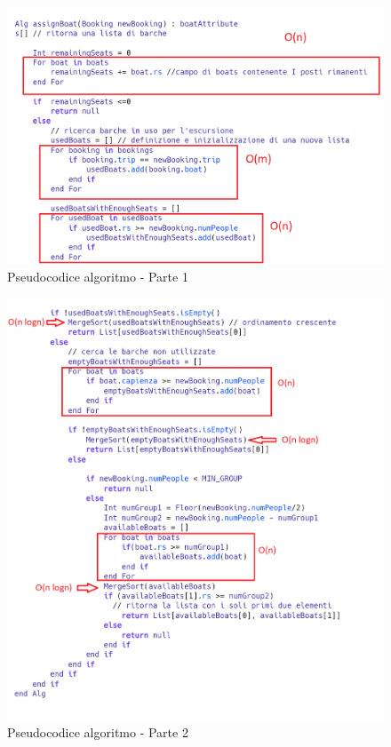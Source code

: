 \begin{figure}[htbp]
    \includegraphics[scale=0.5]{images/iterazione2/pseudocodice/1.png}
    \centering
    \caption{Pseudocodice algoritmo - Parte 1}
    \label{fig:pseudocodice1}
\end{figure}
\begin{figure}[htbp]
    \includegraphics[scale=0.5]{images/iterazione2/pseudocodice/2.png}
    \centering
    \caption{Pseudocodice algoritmo - Parte 2}
    \label{fig:pseudocodice2}
\end{figure}

